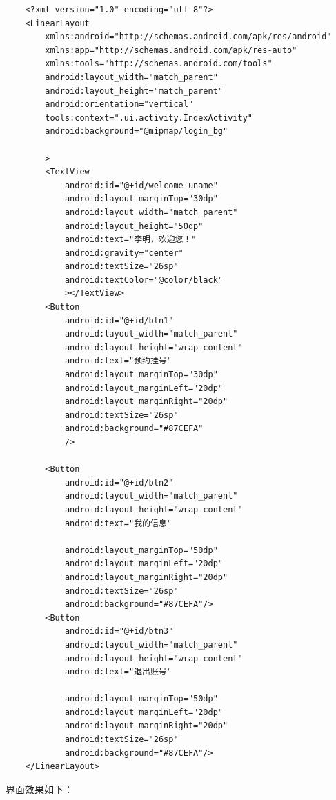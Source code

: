 \documentclass[UTF8,12pt]{article}
\begin{document}
\begin{lstlisting}
    <?xml version="1.0" encoding="utf-8"?>
    <LinearLayout
        xmlns:android="http://schemas.android.com/apk/res/android"
        xmlns:app="http://schemas.android.com/apk/res-auto"
        xmlns:tools="http://schemas.android.com/tools"
        android:layout_width="match_parent"
        android:layout_height="match_parent"
        android:orientation="vertical"
        tools:context=".ui.activity.IndexActivity"
        android:background="@mipmap/login_bg"
    
        >
        <TextView
            android:id="@+id/welcome_uname"
            android:layout_marginTop="30dp"
            android:layout_width="match_parent"
            android:layout_height="50dp"
            android:text="李明，欢迎您！"
            android:gravity="center"
            android:textSize="26sp"
            android:textColor="@color/black"
            ></TextView>
        <Button
            android:id="@+id/btn1"
            android:layout_width="match_parent"
            android:layout_height="wrap_content"
            android:text="预约挂号"
            android:layout_marginTop="30dp"
            android:layout_marginLeft="20dp"
            android:layout_marginRight="20dp"
            android:textSize="26sp"
            android:background="#87CEFA"
            />
    
        <Button
            android:id="@+id/btn2"
            android:layout_width="match_parent"
            android:layout_height="wrap_content"
            android:text="我的信息"
    
            android:layout_marginTop="50dp"
            android:layout_marginLeft="20dp"
            android:layout_marginRight="20dp"
            android:textSize="26sp"
            android:background="#87CEFA"/>
        <Button
            android:id="@+id/btn3"
            android:layout_width="match_parent"
            android:layout_height="wrap_content"
            android:text="退出账号"
    
            android:layout_marginTop="50dp"
            android:layout_marginLeft="20dp"
            android:layout_marginRight="20dp"
            android:textSize="26sp"
            android:background="#87CEFA"/>
    </LinearLayout>
\end{lstlisting}

界面效果如下：

\newpage
\end{document}
